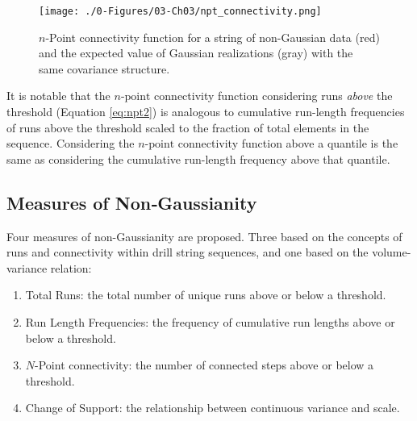 \begin{figure}[htb!]
    \centering
    \texttt{[image: ./0-Figures/03-Ch03/npt\_connectivity.png]}
    \caption{$n$-Point connectivity function for a string of non-Gaussian data (red) and the expected value of Gaussian realizations (gray) with the same covariance structure.}
    \label{fig:npt_connectivity}
\end{figure}

It is notable that the $n\text{-point}$ connectivity function considering runs \emph{above} the threshold (Equation \ref{eq:npt2}) is analogous to cumulative run-length frequencies of runs above the threshold scaled to the fraction of total elements in the sequence. Considering the $n\text{-point}$ connectivity function above a quantile is the same as considering the cumulative run-length frequency above that quantile.

\FloatBarrier
\subsection{Measures of Non‐Gaussianity}
\label{subsec:03ngmeasures}

Four measures of non-Gaussianity are proposed. Three based on the concepts of runs and connectivity within drill string sequences, and one based on the volume-variance relation:
\begin{enumerate}[noitemsep]
    \item Total Runs: the total number of unique runs above or below a threshold.
    \item Run Length Frequencies: the frequency of cumulative run lengths above or below a threshold.
    \item $N$-Point connectivity: the number of connected steps above or below a threshold.
    \item Change of Support: the relationship between continuous variance and scale.
\end{enumerate}

